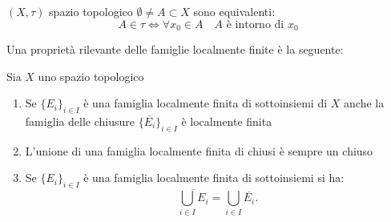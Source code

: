         \begin{richiamo}
        \label{rich:car_aperti}
        $(X, \tau)$ spazio topologico $\emptyset \neq A \subset X$ sono equivalenti:
        \[ A \in \tau \iff \forall x_0 \in A \quad A \text{ è intorno di } x_0 \]
        \end{richiamo}
        Una proprietà rilevante delle famiglie localmente finite è la seguente:

        \begin{proposizione}
        \label{prop:proprieta_famiglie_localmente_finite}
        \mbox{}

        Sia $X$ uno spazio topologico
        \begin{enumerate}
            \item Se $\{E_i\}_{i \in I}$ è una famiglia localmente finita di sottoinsiemi di $X$ anche la famiglia delle chiusure $\{\overline{E_i}\}_{i \in I}$ è localmente finita
            \item L'unione di una famiglia localmente finita di chiusi è sempre un chiuso
            \item Se $\{E_i\}_{i \in I}$ è una famiglia localmente finita di sottoinsiemi si ha:
            \begin{equation}
            \label{eq:chiusura_unione_localmente_finita}
            \overline{\bigcup_{i \in I} E_i} = \bigcup_{i \in I} \overline{E_i}.
            \end{equation}
        \end{enumerate}
        \end{proposizione}


